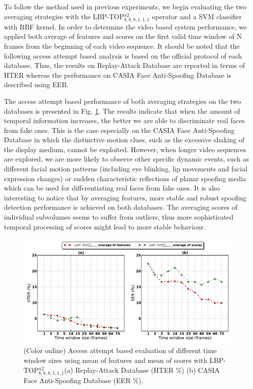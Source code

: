 To follow the method used in previous experiments, we begin evaluating the two averaging strategies with the LBP-TOP$_{8,8,8,1,1,1}^{u2}$ operator and a SVM classifier with RBF kernel. In order to determine the video based system performance, we applied both average of features and scores on the first valid time window of N frames from the beginning of each video sequence. It should be noted that the following access attempt based analysis is based on the official protocol of each database. Thus, the results on Replay-Attack Database are reported in terms of HTER whereas the performance on CASIA Face Anti-Spoofing Database is described using EER.

The access attempt based performance of both averaging strategies on the two databases is presented in Fig. \ref{fig:blocks_in_videos}. The results indicate that when the amount of temporal information increases, the better we are able to discriminate real faces from fake ones. This is the case especially on the CASIA Face Anti-Spoofing Database in which the distinctive motion clues, such as the excessive shaking of the display medium, cannot be exploited. However, when longer video sequences are explored, we are more likely to observe other specific dynamic events, such as different facial motion patterns (including eye blinking, lip movements and facial expression changes) or sudden characteristic reflections of planar spoofing media which can be used for differentiating real faces from fake ones. It is also interesting to notice that by averaging features, more stable and robust spoofing detection performance is achieved on both databases. The averaging scores of individual subvolumes seems to suffer from outliers, thus more sophisticated temporal processing of scores might lead to more stable behaviour.

\begin{figure}[h]
\begin{center}
\includegraphics [width=\textwidth] {images/proposed_countermeasure/video_based_results.pdf}
\caption{(Color online) Access attempt based evaluation of different time window sizes using mean of features and mean of scores with LBP-TOP$_{8,8,8,1,1,1}^{u2}$(a) Replay-Attack Database (HTER \%) (b) CASIA Face Anti-Spoofing Database (EER \%).} \label{fig:blocks_in_videos}
\end{center}
\end{figure}

